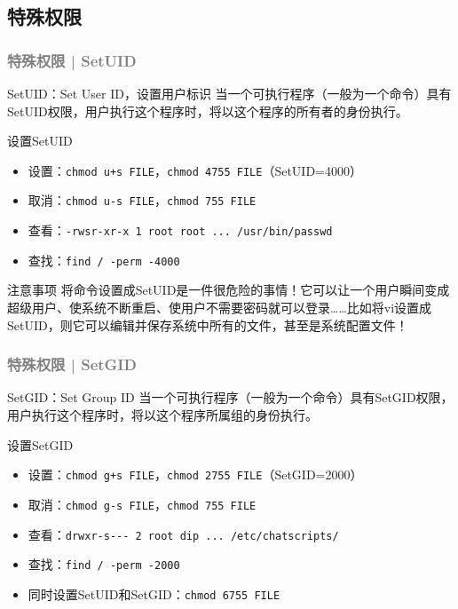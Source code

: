 \subsection{特殊权限}
\begin{frame}[fragile]
  \frametitle{\textcolor{gray}{特殊权限 | SetUID}}
  \begin{block}{SetUID：Set User ID，设置用户标识}
    当一个可执行程序（一般为一个命令）具有SetUID权限，用户执行这个程序时，将以这个程序的所有者的身份执行。
  \end{block}
  \vspace{-0.5em}
  \pause
  \begin{block}{设置SetUID}
    \begin{itemize}
      \item 设置：\verb|chmod u+s FILE|，\verb|chmod 4755 FILE|（SetUID=4000）
      \item 取消：\verb|chmod u-s FILE|，\verb|chmod 755 FILE|
      \item 查看：\verb|-rwsr-xr-x 1 root root ... /usr/bin/passwd|
      \item 查找：\verb|find / -perm -4000|
    \end{itemize}
  \end{block}
  \vspace{-0.5em}
  \pause
  \begin{block}{注意事项}
将命令设置成SetUID是一件很危险的事情！它可以让一个用户瞬间变成超级用户、使系统不断重启、使用户不需要密码就可以登录……比如将vi设置成SetUID，则它可以编辑并保存系统中所有的文件，甚至是系统配置文件！
  \end{block}
\end{frame}

\begin{frame}[fragile]
  \frametitle{\textcolor{gray}{特殊权限 | SetGID}}
  \begin{block}{SetGID：Set Group ID}
    当一个可执行程序（一般为一个命令）具有SetGID权限，用户执行这个程序时，将以这个程序所属组的身份执行。
  \end{block}
  \pause
  \begin{block}{设置SetGID}
    \begin{itemize}
      \item 设置：\verb|chmod g+s FILE|，\verb|chmod 2755 FILE|（SetGID=2000）
      \item 取消：\verb|chmod g-s FILE|，\verb|chmod 755 FILE|
      \item 查看：\verb|drwxr-s--- 2 root dip ... /etc/chatscripts/|
      \item 查找：\verb|find / -perm -2000|
      \item 同时设置SetUID和SetGID：\verb|chmod 6755 FILE|
    \end{itemize}
  \end{block}
\end{frame}

